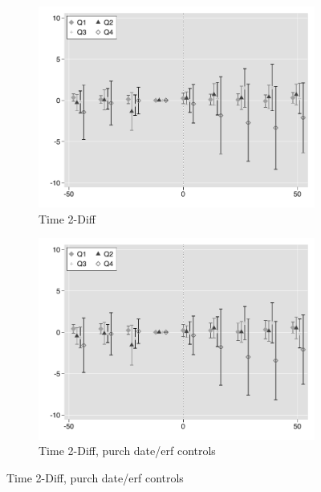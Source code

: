 \documentclass[12pt]{article}
\begin{document}
\begin{figure}
\begin{subfigure}[b]{0.48\textwidth}
        \end{subfigure}
        \begin{subfigure}[b]{0.48\textwidth}
                    \caption[Network2]%
            {{\footnotesize Time 2-Diff}}    
            \label{fig:prefor}
            \centering
            \includegraphics[width=\textwidth,trim={0.3cm .3cm 0.1cm 0cm}, clip=true]{figures/freq_time_2d_no_ctrl_q}
        \end{subfigure}
        \hfill
        \begin{subfigure}[b]{0.48\textwidth}
                    \caption[Network2]%
            {{\footnotesize Time 2-Diff, purch date/erf controls}}    
            \label{fig:prefor}
            \centering
            \includegraphics[width=\textwidth,trim={0.3cm .3cm 0.1cm 0cm}, clip=true]{figures/freq_time_2d_ctrl_q}
        \end{subfigure}
\end{figure}
\end{document}

